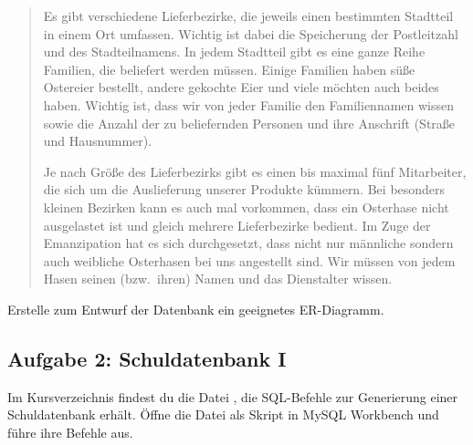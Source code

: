 \begin{quotation}
\noindent
Es gibt verschiedene Lieferbezirke, die jeweils einen bestimmten Stadtteil in
einem Ort umfassen. Wichtig ist dabei die Speicherung der Postleitzahl und des
Stadteilnamens. In jedem Stadtteil gibt es eine ganze Reihe Familien, die
beliefert werden müssen. Einige Familien haben süße Ostereier bestellt, andere
gekochte Eier und viele möchten auch beides haben. Wichtig ist, dass wir von
jeder Familie den Familiennamen wissen sowie die Anzahl der zu beliefernden
Personen und ihre Anschrift (Straße und Hausnummer).

\noindent
Je nach Größe des Lieferbezirks gibt es einen bis maximal fünf Mitarbeiter, die
sich um die Auslieferung unserer Produkte kümmern. Bei besonders kleinen
Bezirken kann es auch mal vorkommen, dass ein Osterhase nicht ausgelastet ist
und gleich mehrere Lieferbezirke bedient. Im Zuge der Emanzipation hat es sich
durchgesetzt, dass nicht nur männliche sondern auch weibliche Osterhasen bei
uns angestellt sind. Wir müssen von jedem Hasen seinen (bzw.\ ihren) Namen und
das Dienstalter wissen.
\end{quotation}

Erstelle zum Entwurf der Datenbank ein geeignetes ER-Diagramm.


\subsection{Aufgabe 2: Schuldatenbank I}

Im Kursverzeichnis findest du die Datei , die SQL-Befehle zur
Generierung einer Schuldatenbank erhält. Öffne die Datei als Skript in MySQL
Workbench und führe ihre Befehle aus.

